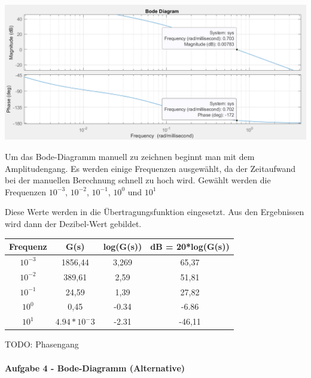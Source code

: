 \documentclass[            %
draft = false,             		%
paper = A4,                		%
pagesize = pdftex,         		%
fontsize = 10pt,           		%
DIV=15,                    		%
twoside = false,           		%
twocolumn = false,         		%
parskip = full,           		%
chapterprefix = false,      		%
appendixprefix = true,     		%
headinclude = false,       		%
footinclude = false,       		%
mpinclude = false,         		%
numbers = auto,            		%
cleardoublepage = plain,   		%
footnotes = multiple,      		%
titlepage = true,          		%
headings = normal,         		%
open = right,              		%
bibliography = openstyle,  		%
listof = chaptergapline,   		%
overfullrule = true,
]{scrbook}
\begin{document}
\begin{center}
   \begin{minipage}[b]{1.0\textwidth}
      \includegraphics[scale=0.7]{Bilder/Phasenrand.PNG}
      \label{fig:Phasenrand} 
   \end{minipage}
\end{center}

Um das Bode-Diagramm manuell zu zeichnen beginnt man mit dem Amplitudengang.
Es werden einige Frequenzen ausgewählt, da der Zeitaufwand bei der manuellen Berechnung schnell zu hoch wird.
Gewählt werden die Frequenzen $10^{-3}$, $10^{-2}$, $10^{-1}$, $10^{0}$ und $10^{1}$

Diese Werte werden in die Übertragungsfunktion eingesetzt. Aus den Ergebnissen wird dann der Dezibel-Wert gebildet.

\begin{center}
\begin{tabular}{|c c c c|} 
 \hline
 Frequenz & G(s) & log(G(s)) & dB = 20*log(G(s)) \\ [0.5ex] 
 \hline
 $10^{-3}$ & 1856,44 & 3,269 & 65,37 \\
 \hline
 $10^{-2}$ & 389,61 & 2,59 & 51,81 \\
 \hline
 $10^{-1}$ & 24,59 & 1,39 & 27,82 \\
 \hline
 $10^{0}$ & 0,45 & -0.34 & -6.86 \\
 \hline
 $10^{1}$ & $4.94*10^-3$ & -2.31 & -46,11 \\
 \hline
\end{tabular}
\end{center}

TODO: Phasengang



\paragraph{Aufgabe 4 - Bode-Diagramm (Alternative)}~\\
\end{document}
